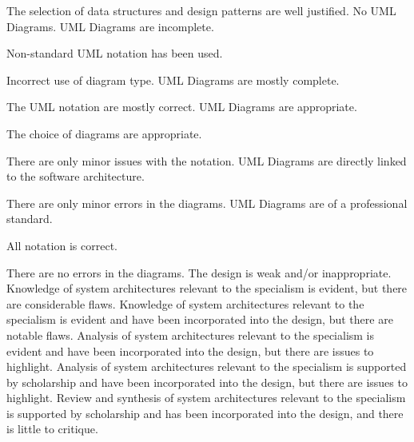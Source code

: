 \documentclass{../../fal_assignment}
\begin{document}
\begin{markingrubric}
	\par The selection of data structures and design patterns are well justified.
%
	\grade\fail No UML Diagrams.
	\grade UML Diagrams are incomplete.
	\par Non-standard UML notation has been used.
	\par Incorrect use of diagram type.
	\grade UML Diagrams are mostly complete.
	\par The UML notation are mostly correct.
	\grade UML Diagrams are appropriate.
	\par The choice of diagrams are appropriate.
	\par There are only minor issues with the notation.
	\grade UML Diagrams are directly linked to the software architecture.
	\par There are only minor errors in the diagrams.
	\grade UML Diagrams are of a professional standard.
	\par All notation is correct.
	\par There are no errors in the diagrams.
%
	\grade\fail The design is weak and/or inappropriate.
	\grade Knowledge of system architectures relevant to the specialism is evident, but there are considerable flaws.
	\grade Knowledge of system architectures relevant to the specialism is evident and have been incorporated into the design, but there are notable flaws.
	\grade Analysis of system architectures relevant to the specialism is evident and have been incorporated into the design, but there are issues to highlight.
	\grade Analysis of system architectures relevant to the specialism is supported by scholarship and have been incorporated into the design, but there are issues to highlight.
	\grade Review and synthesis of system architectures relevant to the specialism is supported by scholarship and has been incorporated into the design, and there is little to critique.
%
\end{markingrubric}
\end{document}
